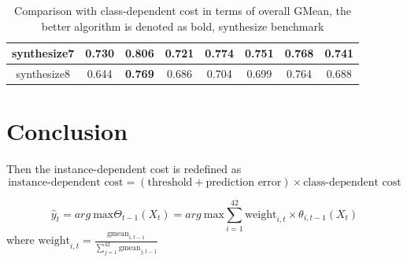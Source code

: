 \documentclass{article}
\begin{document}
\begin{table}[!ht]
\begin{tabular}{|c||c|c|ccccc|}
		synthesize7               & 0.730          & \textbf{0.806}                         & \multicolumn{1}{c|}{0.721}          & \multicolumn{1}{c|}{0.774} & \multicolumn{1}{c|}{0.751}          & \multicolumn{1}{c|}{0.768}          & 0.741          \\ \hline
		synthesize8               & 0.644            & \textbf{0.769}                        & \multicolumn{1}{c|}{0.686}          & \multicolumn{1}{c|}{0.704}          & \multicolumn{1}{c|}{0.699}          & \multicolumn{1}{c|}{0.764}          & 0.688          \\ \hline
	\end{tabular}
	\label{tab04:overall}
	\caption{Comparison with class-dependent cost in terms of overall GMean, the better algorithm is denoted as bold, synthesize benchmark}
\end{table}
\section{Conclusion}
Then the instance-dependent cost is redefined as 
\begin{equation}
	\text{instance-dependent cost}= (\text{threshold}+ \text{prediction error})\times \text{class-dependent cost}
\end{equation}

$$\hat{y}_t =arg\ \text{max} \Theta_{t-1}(X_t)=arg\ \text{max} \sum_{i=1}^{42} \text{weight}_{i,t} \times \theta_{i,t-1}(X_t)$$
where $\text{weight}_{i,t}=\frac{\text{gmean}_{i,t-1}}{\sum_{j=1}^{42}\text{gmean}_{j,t-1}}$ 
\end{document}
